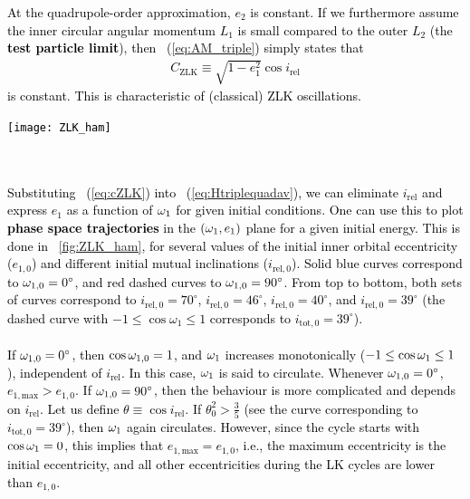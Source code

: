 \documentclass[main.tex]{subfiles}
\begin{document}
\begin{tcolorbox}[sharp corners, colback=green!30, colframe=green!80!blue, title=Box \ref{boxchap3:dynVI} -- Orbital dynamics VI (continued)]
\par \textcolor{black}{
At the quadrupole-order approximation, $e_2$ is constant. If we furthermore assume the inner circular angular momentum $L_1$ is small compared to the outer $L_2$ (the {\bf test particle limit}), then \Eq~(\ref{eq:AM_triple}) simply states that
\begin{align}
\label{eq:cZLK}
C_\mathrm{ZLK} \equiv \sqrt{1-e_1^2} \cos i_\mathrm{rel}
\end{align}
is constant. This is characteristic of (classical) ZLK oscillations.
\begin{minipage}[t]{0.5\linewidth}
    \vspace*{0pt}
        \texttt{[image: ZLK\_ham]}
        \label{fig:ZLK_ham}
    \end{minipage} \\ \\
Substituting \Eq~(\ref{eq:cZLK}) into \Eq~(\ref{eq:Htriplequadav}), we can eliminate $i_\mathrm{rel}$ and express $e_1$ as a function of $\omega_1$ for given initial conditions. One can use this to plot {\bf phase space trajectories} in the $(\omega_1,e_1)$ plane for a given initial energy. This is done in \F~\ref{fig:ZLK_ham}, for several values of the initial inner orbital eccentricity ($e_{1,0}$) and different initial mutual inclinations ($i_{\mathrm{rel},0}$). Solid blue curves correspond to $\omega_{1,0} = 0^\circ$, and red dashed curves to $\omega_{1,0} = 90^\circ$. From top to bottom, both sets of curves correspond to $i_{\mathrm{rel},0} = 70^\circ$, $i_{\mathrm{rel},0} = 46^\circ$, $i_{\mathrm{rel},0} = 40^\circ$, and $i_{\mathrm{rel},0} = 39^\circ$ (the dashed curve with $-1\leq\cos\omega_1\leq1$ corresponds to $i_{\mathrm{tot},0} = 39^\circ$). \\ \\
If $\omega_{1,0} = 0^\circ$, then $\cos\omega_{1,0} = 1$, and $\omega_1$ increases monotonically ($-1 \leq \cos\omega_1 \leq 1$), independent of $i_\mathrm{rel}$. In this case, $\omega_1$ is said to circulate. Whenever $\omega_{1,0} = 0^\circ$, $e_{1,\mathrm{max}} > e_{1,0}$. If $\omega_{1,0} = 90^\circ$, then the behaviour is more complicated and depends on $i_\mathrm{rel}$. Let us define $\theta \equiv \cos i_\mathrm{rel}$. If $\theta_0^2 > \frac{3}{5}$ (see the curve corresponding to $i_{\mathrm{tot},0} = 39^\circ$), then $\omega_1$ again circulates. However, since the cycle starts with $\cos\omega_1 = 0$, this implies that $e_{1,\mathrm{max}}= e_{1,0}$, i.e., the maximum eccentricity is the initial eccentricity, and all other eccentricities during the LK cycles are lower than $e_{1,0}$. }
\end{tcolorbox}
\end{document}
